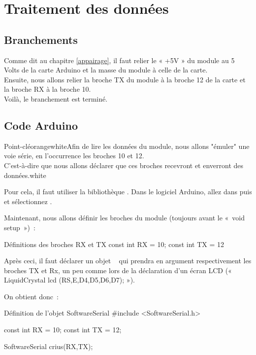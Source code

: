 \chapter{Traitement des données}

\section{Branchements}

Comme dit au chapitre \ref{appairage}, il faut relier le « +5V » du module au  5 Volts de la carte Arduino et la masse du module à celle de la carte.\\
Ensuite, nous allons relier la broche TX du module à la broche 12 de la carte et la broche RX à la broche 10. \\
Voilà, le branchement est terminé.

\section{Code Arduino}



\begin{messageBox}{Point-clé}{orange}{white}{Afin de lire les données du module, nous allons "émuler" une voie série, en l’occurrence les broches 10 et 12. \\
C'est-à-dire que nous allons déclarer que ces broches recevront et enverront des données.}{white}
\end{messageBox}


Pour cela, il faut utiliser la bibliothèque .
Dans le logiciel Arduino, allez dans  puis   et sélectionnez .


Maintenant, nous allons définir les broches du module (toujours avant le « void setup ») :

\begin{Cpp}{Définitions des broches RX et TX}
const int RX = 10;
const int TX = 12
\end{Cpp}

Après ceci, il faut déclarer un objet   qui prendra en argument respectivement les broches TX et Rx, un peu comme lors de la déclaration d'un écran LCD (« LiquidCrystal lcd (RS,E,D4,D5,D6,D7); »).

On obtient donc :

\begin{Cpp}{Définition de l'objet SoftwareSerial}
#include <SoftwareSerial.h>

const int RX = 10;
const int TX = 12;

SoftwareSerial crius(RX,TX);
\end{Cpp}

